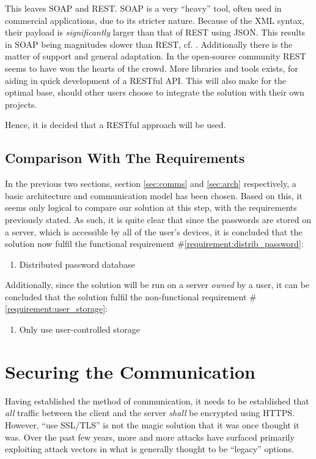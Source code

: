			This leaves SOAP and REST. SOAP is a very ``heavy'' tool, often used in commercial applications, due to its stricter nature. Because of the XML syntax, their payload is \emph{significantly} larger than that of REST using JSON. This results in SOAP being magnitudes slower than REST, cf. \cite{soap_vs_rest}. Additionally there is the matter of support and general adaptation. In the open-source community REST seems to have won the hearts of the crowd. More libraries and tools exists, for aiding in quick development of a RESTful API. This will also make for the optimal base, should other users choose to integrate the solution with their own projects.

			Hence, it is decided that a RESTful approach will be used. 

		\subsection{Comparison With The Requirements}
			\label{requirement:fulfilled:distrib_password}
			\label{requirement:fulfilled:user_storage}

			In the previous two sections, section \ref{sec:comms} and \ref{sec:arch} respectively, a basic architecture and communication model has been chosen. Based on this, it seems only logical to compare our solution at this step, with the requirements previously stated. As such, it is quite clear that since the passwords are stored on a server, which is accessible by all of the user's devices, it is concluded that the solution now fulfil the functional requirement \#\ref{requirement:distrib_password}:

			\vspace{-3ex}\begin{enumerate}
				\setlength\itemsep{0.1em}
				\item Distributed password database
			\end{enumerate}

			Additionally, since the solution will be run on a server \emph{owned} by a user, it can be concluded that the solution fulfil the non-functional requirement \#\ref{requirement:user_storage}:
			\vspace{-3ex}\begin{enumerate}
				\setlength\itemsep{0.1em}
				\item Only use user-controlled storage
			\end{enumerate}

	\section{Securing the Communication}
		\label{sec:design:secure-comms}
		Having established the method of communication, it needs to be established that \emph{all} traffic between the client and the server \emph{shall} be encrypted using HTTPS. However, ``use SSL/TLS'' is not the magic solution that it was once thought it was. Over the past few years, more and more attacks have surfaced primarily exploiting attack vectors in what is generally thought to be ``legacy'' options.

